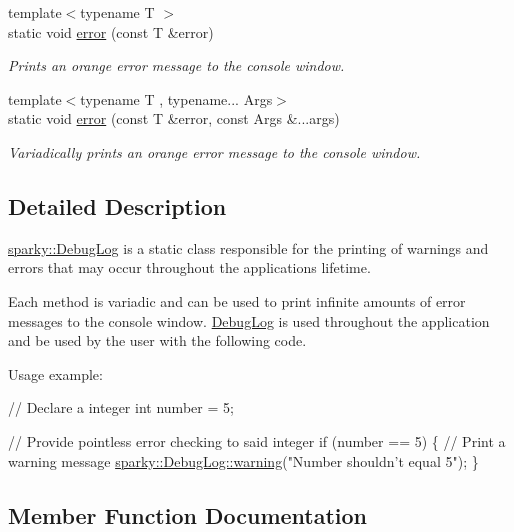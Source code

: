 \begin{DoxyCompactItemize}
{\footnotesize template$<$typename T $>$ }\\static void \hyperlink{classsparky_1_1_debug_log_aa207182f9ce97f93bf00108b9d3c3049}{error} (const T \&error)
\begin{DoxyCompactList}\small\item\em Prints an orange error message to the console window. \end{DoxyCompactList}\item 
{\footnotesize template$<$typename T , typename... Args$>$ }\\static void \hyperlink{classsparky_1_1_debug_log_a42aee4ffb1db1d36690eee96fcb56820}{error} (const T \&error, const Args \&...args)
\begin{DoxyCompactList}\small\item\em Variadically prints an orange error message to the console window. \end{DoxyCompactList}\end{DoxyCompactItemize}


\subsection{Detailed Description}
\hyperlink{classsparky_1_1_debug_log}{sparky\+::\+Debug\+Log} is a static class responsible for the printing of warnings and errors that may occur throughout the applications lifetime.

Each method is variadic and can be used to print infinite amounts of error messages to the console window. \hyperlink{classsparky_1_1_debug_log}{Debug\+Log} is used throughout the application and be used by the user with the following code.

Usage example\+: 
\begin{DoxyCode}
\textcolor{comment}{// Declare a integer}
\textcolor{keywordtype}{int} number = 5;

\textcolor{comment}{// Provide pointless error checking to said integer}
\textcolor{keywordflow}{if} (number == 5)
\{
    \textcolor{comment}{// Print a warning message}
    \hyperlink{classsparky_1_1_debug_log_aa49f9dd55fc30378f680401b5618267e}{sparky::DebugLog::warning}(\textcolor{stringliteral}{"Number shouldn't equal 5"});
\}
\end{DoxyCode}
 

\subsection{Member Function Documentation}
